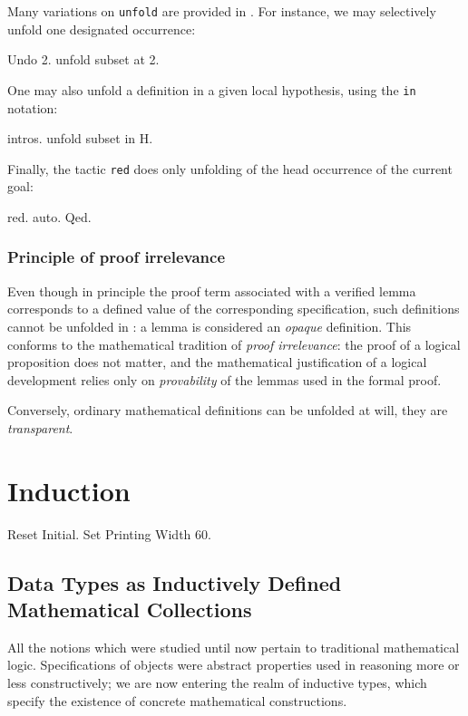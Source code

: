 \documentclass[11pt,a4paper]{book}
\begin{document}
Many variations on \verb:unfold: are provided in \Coq. For instance,
we may selectively unfold one designated occurrence:
\begin{coq_example}
Undo 2.
unfold subset at 2.
\end{coq_example}

One may also unfold a definition in a given local hypothesis, using the
\verb:in: notation:
\begin{coq_example}
intros.
unfold subset in H.
\end{coq_example}

Finally, the tactic \verb:red: does only unfolding of the head occurrence
of the current goal:
\begin{coq_example}
red.
auto.
Qed.
\end{coq_example}


\subsection{Principle of proof irrelevance}

Even though in principle the proof term associated with a verified lemma
corresponds to a defined value of the corresponding specification, such
definitions cannot be unfolded in \Coq: a lemma is considered an {\sl opaque}
definition. This conforms to the mathematical tradition of {\sl proof
irrelevance}: the proof of a logical proposition does not matter, and the
mathematical justification of a logical development relies only on
{\sl provability} of the lemmas used in the formal proof. 

Conversely, ordinary mathematical definitions can be unfolded at will, they
are {\sl transparent}. 

\chapter{Induction}

\begin{coq_eval}
Reset Initial.
Set Printing Width 60.
\end{coq_eval}

\section{Data Types as Inductively Defined Mathematical Collections}

All the notions which were studied until now pertain to traditional
mathematical logic. Specifications of objects were abstract properties
used in reasoning more or less constructively; we are now entering
the realm of inductive types, which specify the existence of concrete
mathematical constructions.
\end{document}
